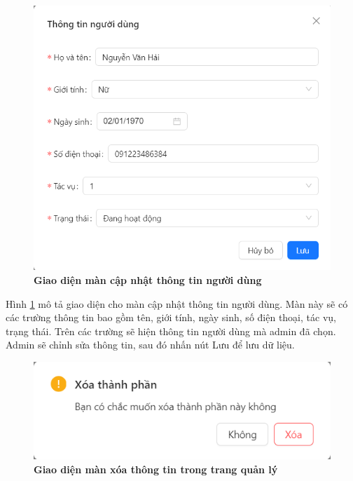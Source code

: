 \begin{figure}[H]
  \centering
  \includegraphics[scale=0.7]{Images/server/webUI/updateUser.png}
  \caption[Giao diện màn cập nhật thông tin người dùng]{\bfseries \fontsize{12pt}{0pt}\selectfont Giao diện màn cập nhật thông tin người dùng}
  \label{editUser} %
\end{figure}

Hình \ref{editUser} mô tả giao diện cho màn cập nhật thông tin người dùng. Màn này sẽ có các trường thông tin bao gồm 
tên, giới tính, ngày sinh, số điện thoại, tác vụ, trạng thái. Trên các trường sẽ hiện thông tin người dùng mà admin đã chọn. 
Admin sẽ chỉnh sửa thông tin, sau đó nhấn nút Lưu để lưu dữ liệu.

\begin{figure}[H]
  \centering
  \includegraphics[scale=0.7]{Images/server/webUI/delete.png}
  \caption[Giao diện màn xóa thông tin trong trang quản lý]{\bfseries \fontsize{12pt}{0pt}\selectfont Giao diện màn xóa thông tin trong trang quản lý}
  \label{delete} %
\end{figure}

